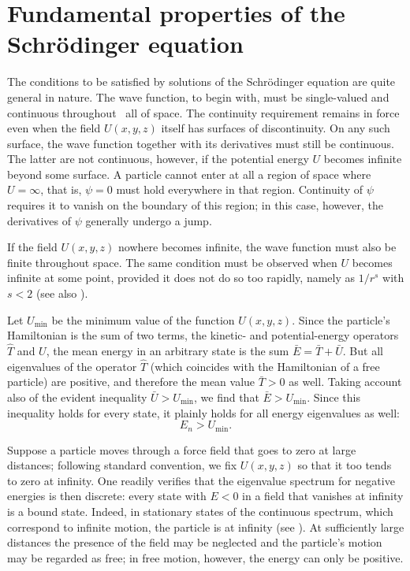 \section{Fundamental properties of the Schrödinger equation}

The conditions to be satisfied by solutions of the Schrödinger equation are
quite general in nature. The wave function, to begin with, must be
single-valued and continuous throughout%
\relax\ all of space. The continuity requirement remains in force even when the
field $U(x,y,z)$ itself has surfaces of discontinuity. On any such surface,
the wave function together with its derivatives must still be continuous. The latter are
not continuous, however, if the potential energy $U$ becomes infinite beyond
some surface. A particle cannot enter at all a region of space where
$U=\infty$, that is, $\psi=0$ must hold everywhere in that region. Continuity
of $\psi$ requires it to vanish on the boundary of this region; in this case,
however, the derivatives of $\psi$ generally undergo a jump.

If the field $U(x,y,z)$ nowhere becomes infinite, the wave function must also
be finite throughout space. The same condition must be observed when $U$
becomes infinite at some point, provided it does not do so too rapidly, namely
as $1/r^s$ with $s<2$ (see also ).

Let $U_{\min}$ be the minimum value of the function $U(x,y,z)$. Since the
particle's Hamiltonian is the sum of two terms, the kinetic- and
potential-energy operators $\hat T$ and $U$, the mean energy in an arbitrary
state is the sum $\bar E=\bar T+\bar U$. But all eigenvalues of the operator
$\hat T$ (which coincides with the Hamiltonian of a free particle) are
positive, and therefore the mean value $\bar T>0$ as well. Taking account also
of the evident inequality $\bar U>U_{\min}$, we find that
$\bar E>U_{\min}$. Since this inequality holds for every state, it plainly
holds for all energy eigenvalues as well:
\begin{equation}
  E_n>U_{\min}.
  \tag{18.1}
\end{equation}

Suppose a particle moves through a force field that goes to zero at large
distances; following standard convention, we fix $U(x,y,z)$ so that it too
tends to zero at infinity. One readily verifies that the
eigenvalue spectrum for negative energies is then discrete: every state with
$E<0$ in a field that vanishes at infinity is a bound state. Indeed, in stationary states of the continuous spectrum,
which correspond to infinite motion, the particle is at infinity (see
). At sufficiently large distances the presence of the field may be
neglected and the particle's motion may be regarded as free; in free motion,
however, the energy can only be positive.


